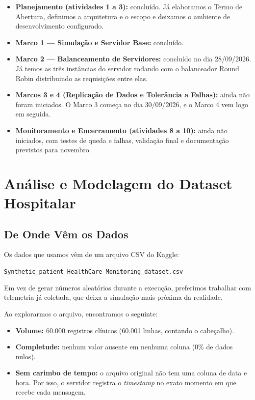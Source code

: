 \documentclass[12pt,a4paper]{article}
\begin{document}
	\begin{itemize}
		\item \textbf{Planejamento (atividades 1 a 3):} concluído. Já elaboramos o Termo de Abertura, definimos a arquitetura e o escopo e deixamos o ambiente de desenvolvimento configurado.
		\item \textbf{Marco 1 — Simulação e Servidor Base:} concluído.
		\item \textbf{Marco 2 — Balanceamento de Servidores:} concluído no dia 28/09/2026. Já temos as três instâncias do servidor rodando com o balanceador Round Robin distribuindo as requisições entre elas.
		\item \textbf{Marcos 3 e 4 (Replicação de Dados e Tolerância a Falhas):} ainda não foram iniciados. O Marco 3 começa no dia 30/09/2026, e o Marco 4 vem logo em seguida.
		\item \textbf{Monitoramento e Encerramento (atividades 8 a 10):} ainda não iniciados, com testes de queda e falhas, validação final e documentação previstos para novembro.
	\end{itemize}
	
	\section{Análise e Modelagem do Dataset Hospitalar}
	
	\subsection{De Onde Vêm os Dados}
	Os dados que usamos vêm de um arquivo CSV do Kaggle:
	\begin{center}
		\texttt{Synthetic\_patient-HealthCare-Monitoring\_dataset.csv}
	\end{center}
	Em vez de gerar números aleatórios durante a execução, preferimos trabalhar com telemetria já coletada, que deixa a simulação mais próxima da realidade.
	
	Ao explorarmos o arquivo, encontramos o seguinte:
	\begin{itemize}
		\item \textbf{Volume:} 60.000 registros clínicos (60.001 linhas, contando o cabeçalho).
		\item \textbf{Completude:} nenhum valor ausente em nenhuma coluna (0\% de dados nulos).
		\item \textbf{Sem carimbo de tempo:} o arquivo original não tem uma coluna de data e hora. Por isso, o servidor registra o \textit{timestamp} no exato momento em que recebe cada mensagem.
	\end{itemize}
	
\end{document}
